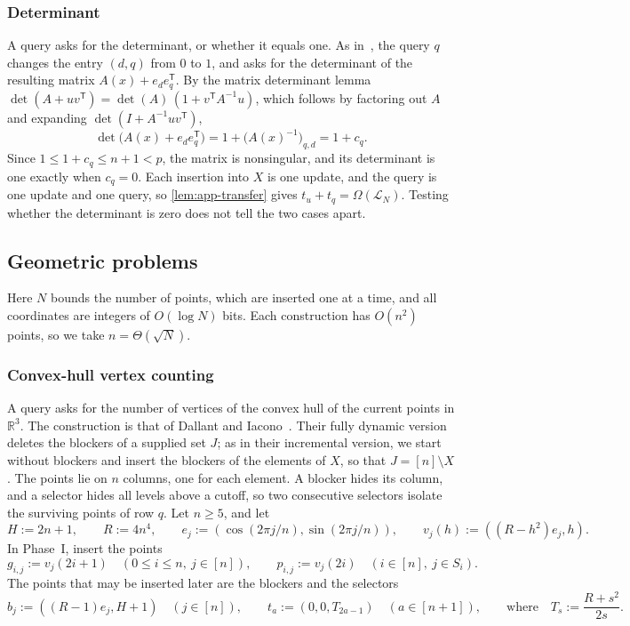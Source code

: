 \subsubsection{Determinant}\label{sec:app-determinant}

A query asks for the determinant, or whether it equals one. As in~\cite[Equation~(11)]{van_den_brand_dynamic_2019}, the query $q$ changes the entry $(d,q)$ from $0$ to $1$, and asks for the determinant of the resulting matrix $A(x)+e_de_q^{\mathsf T}$. By the matrix determinant lemma $\det(A+uv^{\mathsf T})=\det(A)\,(1+v^{\mathsf T}A^{-1}u)$, which follows by factoring out $A$ and expanding $\det(I+A^{-1}uv^{\mathsf T})$,
\[
\det\big(A(x)+e_de_q^{\mathsf T}\big)=1+\big(A(x)^{-1}\big)_{q,d}=1+c_q.
\]
Since $1\le1+c_q\le n+1<p$, the matrix is nonsingular, and its determinant is one exactly when $c_q=0$. Each insertion into $X$ is one update, and the query is one update and one query, so \cref{lem:app-transfer} gives $t_u+t_q=\Omega(\mathcal L_N)$. Testing whether the determinant is zero does not tell the two cases apart.

\subsection{Geometric problems}\label{sec:geometric-counting}

Here $N$ bounds the number of points, which are inserted one at a time, and all coordinates are integers of $O(\log N)$ bits. Each construction has $O(n^2)$ points, so we take $n=\Theta(\sqrt N)$.

\subsubsection{Convex-hull vertex counting}\label{sec:hull}

A query asks for the number of vertices of the convex hull of the current points in $\mathbb R^3$. The construction is that of Dallant and Iacono~\cite[ESA version, Section~3, Theorem~10 and Lemma~11]{dallant_conditional_2022}. Their fully dynamic version deletes the blockers of a supplied set $J$; as in their incremental version, we start without blockers and insert the blockers of the elements of $X$, so that $J=[n]\setminus X$. The points lie on $n$ columns, one for each element. A blocker hides its column, and a selector hides all levels above a cutoff, so two consecutive selectors isolate the surviving points of row $q$. Let $n\ge5$, and let
\[
 H:=2n+1,\qquad R:=4n^4,\qquad
 e_j:=(\cos(2\pi j/n),\sin(2\pi j/n)),\qquad
 v_j(h):=((R-h^2)e_j,h).
\]
In Phase~I, insert the points
\[
 g_{i,j}:=v_j(2i+1)\quad(0\le i\le n,\ j\in[n]),
 \qquad
 p_{i,j}:=v_j(2i)\quad(i\in[n],\ j\in S_i).
\]
The points that may be inserted later are the blockers and the selectors
\[
 b_j:=((R-1)e_j,H+1)\quad(j\in[n]),\qquad
 t_a:=(0,0,T_{2a-1})\quad(a\in[n+1]),\qquad
 \text{where}\quad T_s:=\frac{R+s^2}{2s}.
\]


